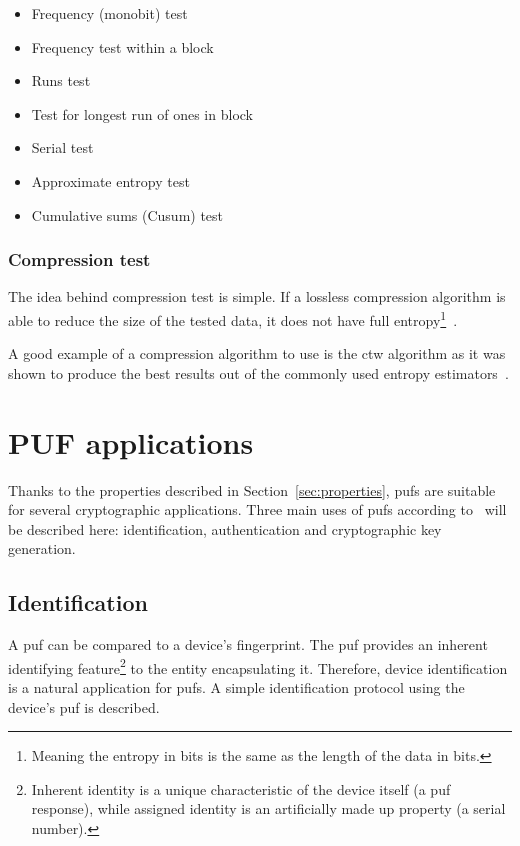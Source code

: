 \begin{itemize}
    \item Frequency (monobit) test
    \item Frequency test within a block
    \item Runs test
    \item Test for longest run of ones in block
    \item Serial test
    \item Approximate entropy test
    \item Cumulative sums (Cusum) test
\end{itemize}

\subsubsection*{Compression test}

The idea behind compression test is simple. If a lossless compression algorithm is able to reduce the size of the tested data, it does not have full entropy\footnote{Meaning the entropy in bits is the same as the length of the data in bits.}~\cite{Leest2010}.

A good example of a compression algorithm to use is the \gls{ctw} algorithm as it was shown to produce the best results out of the commonly used entropy estimators~\cite{Yun2008}.

\section{PUF applications}\label{sec:puf_applications}

Thanks to the properties described in Section~\ref{sec:properties}, \glspl{puf} are suitable for several cryptographic applications. Three main uses of \glspl{puf} according to~\cite{Maes2012} will be described here: identification, authentication and cryptographic key generation.


\subsection{Identification}\label{sec:identification}

A \gls{puf} can be compared to a device's fingerprint. The \gls{puf} provides an inherent identifying feature\footnote{Inherent identity is a unique characteristic of the device itself (a \gls{puf} response), while assigned identity is an artificially made up property (a serial number).} to the entity encapsulating it.  Therefore, device identification is a natural application for \glspl{puf}. A simple identification protocol using the device's \gls{puf} is described.

